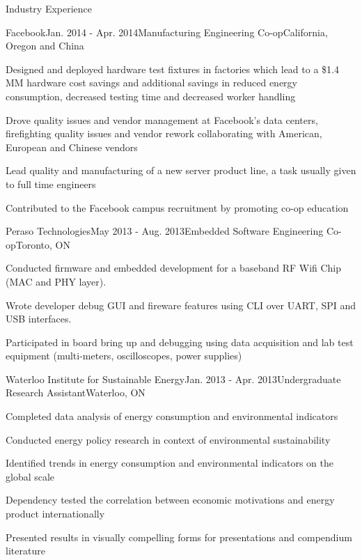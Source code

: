 \documentclass{resume} %
\begin{document}
\begin{rSection}{Industry Experience}
\begin{rSubsection}{Facebook}{Jan. 2014 - Apr. 2014}{Manufacturing Engineering Co-op}{California, Oregon and China}
\item Designed and deployed hardware test fixtures in factories which lead to a \$1.4 MM hardware cost savings and additional savings in reduced energy consumption, decreased testing time and decreased worker handling
\item Drove quality issues and vendor management at Facebook's data centers, firefighting quality issues and vendor rework collaborating with American, European and Chinese vendors
\item Lead quality and manufacturing of a new server product line, a task usually given to full time engineers
\item Contributed to the Facebook campus recruitment by promoting co-op education

\end{rSubsection}

\begin{rSubsection}{Peraso Technologies}{May 2013 - Aug. 2013}{Embedded Software Engineering Co-op}{Toronto, ON}
\item Conducted firmware and embedded development for a baseband RF Wifi Chip (MAC and PHY layer).
\item Wrote developer debug GUI and fireware features using CLI over UART, SPI and USB interfaces. 
\item Participated in board bring up and debugging using data acquisition and lab test equipment (multi-meters, oscilloscopes, power supplies)

\end{rSubsection}



\begin{rSubsection}{Waterloo Institute for Sustainable Energy}{Jan. 2013 - Apr. 2013}{Undergraduate Research Assistant}{Waterloo, ON}
\item Completed data analysis of energy consumption and environmental indicators
\item Conducted energy policy research in context of environmental sustainability
\item Identified trends in energy consumption and environmental indicators on the global scale 
\item Dependency tested the correlation between economic motivations and energy product internationally 
\item Presented results in visually compelling forms for presentations and compendium literature


\end{rSubsection}
\end{rSection}
\end{document}
